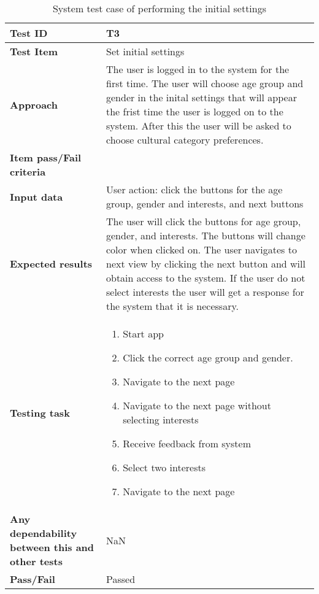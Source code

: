 \begin{center}
	\begin{table}[H]
		\begin{tabular}{ | p{4cm} | p{12cm}  |}			
			\hline
			\textbf{Test ID} & T3  \\ \hline
			\textbf{Test Item} & Set initial settings \\ \hline
			\textbf{Approach} & The user is logged in to the system for the first time. The user will choose age group and gender in the inital settings that will appear the frist time the user is logged on to the system. After this the user will be asked to choose cultural category preferences.  \\ \hline
			\textbf{Item pass/Fail criteria} & \\ \hline
			\textbf{Input data} &  User action: click the buttons for the age group, gender and interests, and next buttons  \\ \hline
			\textbf{Expected results} & The user will click the buttons for age group, gender, and interests. The buttons will change color when clicked on. The user navigates to next view by clicking the next button and will obtain access to the system. If the user do not select interests the user will get a response for the system that it is necessary. \\ \hline
			\textbf{Testing task} & 
			\begin{enumerate}[noitemsep]
				\item Start app
				\item Click the correct age group and gender.
				\item Navigate to the next page
				\item Navigate to the next page without selecting interests
				\item Receive feedback from system
				\item Select two interests
				\item Navigate to the next page
			\end{enumerate}
			\\ \hline
			\textbf{Any dependability between this and other tests} & NaN \\ \hline	
			\textbf{Pass/Fail} & Passed \\\hline				
		\end{tabular}

	\caption{System test case of performing the initial settings}
	\label{Tab_systemTesting3}
	\end{table}
\end{center}

